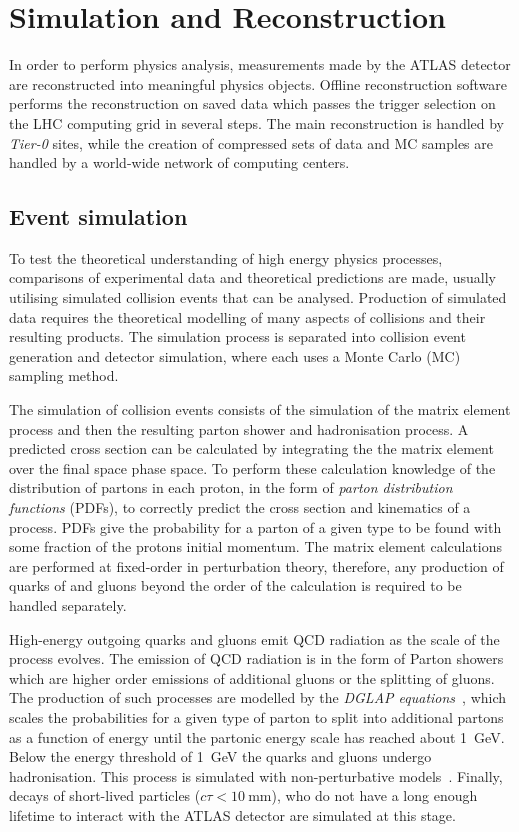 \chapter{Simulation and Reconstruction}\label{chap:SimReco}
In order to perform physics analysis, measurements made by the ATLAS detector are reconstructed into meaningful physics objects. Offline reconstruction software performs the reconstruction on saved data which passes the trigger selection on the LHC computing grid in several steps. The main reconstruction is handled by \emph{Tier-0} sites, while the creation of compressed sets of data and MC samples are handled by a world-wide network of computing centers.

\section{Event simulation}
To test the theoretical understanding of high energy physics processes, comparisons of experimental data and theoretical predictions are made, usually utilising simulated collision events that can be analysed. Production of simulated data requires the theoretical modelling of many aspects of \protonproton collisions and their resulting products. The simulation process is separated into collision event generation and detector simulation, where each uses a Monte Carlo (MC) sampling method. 

The simulation of collision events consists of the simulation of the matrix element process and then the resulting parton shower and hadronisation process. A predicted cross section can be calculated by integrating the the matrix element over the final space phase space. To perform these calculation knowledge of the distribution of partons in each proton, in the form of \emph{parton distribution functions} (PDFs), to correctly predict the cross section and kinematics of a process. PDFs give the probability for a parton of a given type to be found with some fraction of the protons initial momentum. The matrix element calculations are performed at fixed-order in perturbation theory, therefore, any production of quarks of and gluons beyond the order of the calculation is required to be handled separately. 

High-energy outgoing quarks and gluons emit QCD radiation as the scale of the process evolves. The emission of QCD radiation is in the form of Parton showers which are higher order emissions of additional gluons or the splitting of gluons. The production of such processes are modelled by the \emph{DGLAP equations}~\cite{Dokshitzer77,Gribov72,Altarelli77}, which scales the probabilities for a given type of parton to split into additional partons as a function of energy until the partonic energy scale has reached about \SI{1}{\giga\electronvolt}. Below the energy threshold of \SI{1}{\giga\electronvolt} the quarks and gluons undergo hadronisation. This process is simulated with non-perturbative models~\cite{Andersson1983,Webber1984}. Finally, decays of short-lived particles ($c\tau<\SI{10}{\milli\metre}$), who do not have a long enough lifetime to interact with the ATLAS detector are simulated at this stage. 

